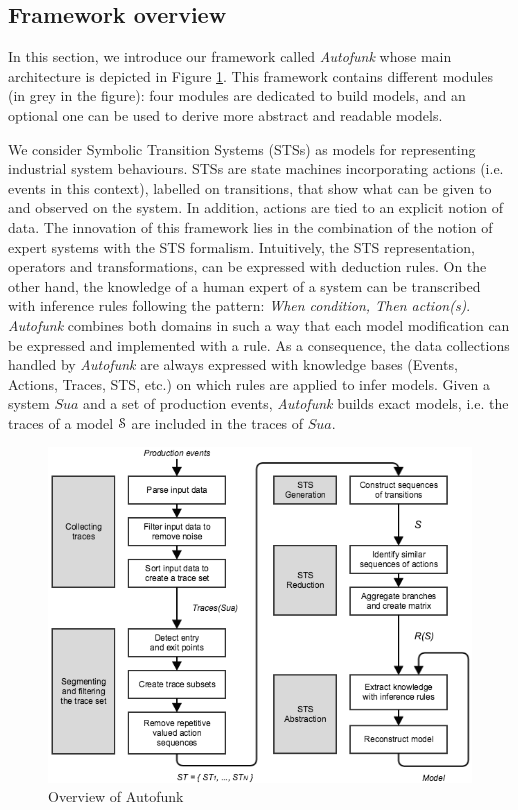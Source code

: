 \subsection{Framework overview}

In this section, we introduce our framework called
\textit{Autofunk} whose main architecture is depicted in Figure
\ref{fig:autofunk}. This framework contains different modules (in
grey in the figure): four modules are dedicated to build models,
and an optional one can be used to derive more abstract and
readable models.

We consider Symbolic Transition Systems (STSs) as models for
representing industrial system behaviours. STSs are state
machines incorporating actions (i.e. events in this context),
labelled on transitions, that show what can be given to and
observed on the system. In addition, actions are tied to an
explicit notion of data.  The innovation of this framework lies
in the combination of the notion of expert systems with the STS
formalism. Intuitively, the STS representation, operators and
transformations, can be expressed with deduction rules. On the
other hand, the knowledge of a human expert of a system can be
transcribed with inference rules following the pattern:
\textit{When condition, Then action(s)}. \textit{Autofunk}
combines both domains in such a way that each model modification
can be expressed and implemented with a rule. As a consequence,
the data collections handled by \textit{Autofunk} are always
expressed with knowledge bases (Events, Actions, Traces, STS,
etc.) on which rules are applied to infer models. Given a system
$Sua$ and a set of production events, \textit{Autofunk} builds
exact models, i.e. the traces of a model $\EuScript{S}$ are
included in the traces of $Sua$.

\begin{figure}[ht]
	\begin{center}
    \includegraphics[width=1.0\linewidth]{figures/autofunk.png}
	\end{center}

    \caption{Overview of Autofunk}
    \label{fig:autofunk}
\end{figure}

